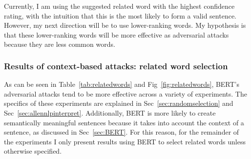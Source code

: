 Currently, I am using the suggested related word with the highest confidence rating, with the intuition that this is the most likely to form a valid sentence. However, my next direction will be to use lower-ranking words. My hypothesis is that these lower-ranking words will be more effective as adversarial attacks because they are less common words.

\subsubsection{Results of context-based attacks: related word selection}
As can be seen in Table~\ref{tab:relatedwords} and Fig~\ref{fig:relatedwords}, BERT's adversarial attacks tend to be more effective across a variety of experiments. The specifics of these experiments are explained in Sec~\ref{sec:randomselection} and Sec~\ref{sec:allennlpinterpret}. Additionally, BERT is more likely to create semantically meaningful sentences because it takes into account the context of a sentence, as discussed in Sec~\ref{sec:BERT}. For this reason, for the remainder of the experiments I only present results using BERT to select related words unless otherwise specified.

